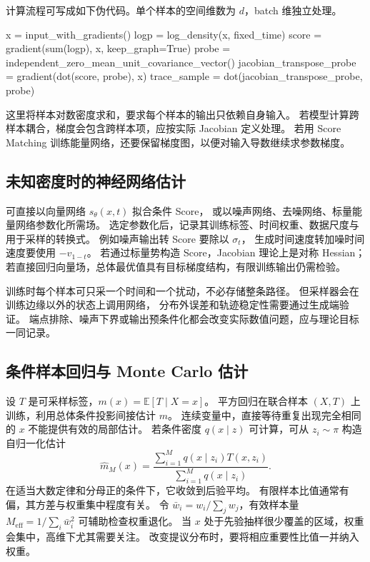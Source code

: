 计算流程可写成如下伪代码。单个样本的空间维数为 \(d\)，batch 维独立处理。
\begin{codeblock}[language=Pseudocode,title={解析 Score 与方向导数}]
x = input_with_gradients()
logp = log_density(x, fixed_time)
score = gradient(sum(logp), x, keep_graph=True)
probe = independent_zero_mean_unit_covariance_vector()
jacobian_transpose_probe = gradient(dot(score, probe), x)
trace_sample = dot(jacobian_transpose_probe, probe)
\end{codeblock}
这里将样本对数密度求和，要求每个样本的输出只依赖自身输入。
若模型计算跨样本耦合，梯度会包含跨样本项，应按实际 Jacobian 定义处理。
若用 Score Matching 训练能量网络，还要保留梯度图，以便对输入导数继续求参数梯度。

\subsection{未知密度时的神经网络估计}

可直接以向量网络 \(s_\theta(x,t)\) 拟合条件 Score，
或以噪声网络、去噪网络、标量能量网络参数化所需场。
选定参数化后，记录其训练标签、时间权重、数据尺度与用于采样的转换式。
例如噪声输出转 Score 要除以 \(\sigma_t\)，
生成时间速度转加噪时间速度要使用 \(-v_{1-t}\)。
若通过标量势构造 Score，Jacobian 理论上是对称 Hessian；
若直接回归向量场，总体最优值具有目标梯度结构，有限训练输出仍需检验。

训练时每个样本可只采一个时间和一个扰动，不必存储整条路径。
但采样器会在训练边缘以外的状态上调用网络，
分布外误差和轨迹稳定性需要通过生成端验证。
端点排除、噪声下界或输出预条件化都会改变实际数值问题，应与理论目标一同记录。

\subsection{条件样本回归与 Monte Carlo 估计}

设 \(T\) 是可采样标签，\(m(x)=\mathbb E[T\mid X=x]\)。
平方回归在联合样本 \((X,T)\) 上训练，利用总体条件投影间接估计 \(m\)。
连续变量中，直接等待重复出现完全相同的 \(x\) 不能提供有效的局部估计。
若条件密度 \(q(x\mid z)\) 可计算，可从 \(z_i\sim\pi\) 构造自归一化估计
\begin{equation}
 \widehat m_M(x)=\frac{\sum_{i=1}^Mq(x\mid z_i)T(x,z_i)}
                         {\sum_{i=1}^Mq(x\mid z_i)}.
 \label{eq:fields-monte-carlo}
\end{equation}
在适当大数定律和分母正的条件下，它收敛到后验平均。
有限样本比值通常有偏，其方差与权重集中程度有关。
令 \(\bar w_i=w_i/\sum_jw_j\)，有效样本量
\(M_{\mathrm{eff}}=1/\sum_i\bar w_i^2\) 可辅助检查权重退化。
当 \(x\) 处于先验抽样很少覆盖的区域，权重会集中，高维下尤其需要关注。
改变提议分布时，要将相应重要性比值一并纳入权重。

